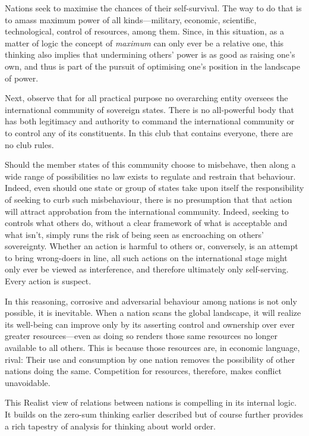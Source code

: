 Nations seek to maximise the chances of their self-survival.
The way to do that is to amass maximum power of all kinds---military,
economic, scientific, technological, control of resources, among them.
Since, in this situation, as a matter of logic
the concept of \textsl{maximum} can only ever be a relative one,
this thinking also implies that undermining others' power is as good as
raising one's own, and thus is part of the pursuit of
optimising one's position in the landscape of power.

Next, observe that for all practical purpose
no overarching entity oversees
the international community of sovereign states.
There is no all-powerful body that has both
legitimacy and authority to command
the international community or to control any of its constituents.
In this club that contains everyone, there are no club rules.

Should the member states of this community choose to misbehave,
then along a wide range of possibilities
no law exists to regulate and restrain that behaviour.
Indeed, even should one state or group of states take upon itself
the responsibility of seeking to curb such misbehaviour,
there is no presumption that that action will attract approbation
from the international community.
Indeed, seeking to controls what others do,
without a clear framework of
what is acceptable and what isn't, simply runs the risk of
being seen as
encroaching on others' sovereignty.
Whether an action is harmful to others
or, conversely, is an attempt to bring wrong-doers in line,
all such actions
on the international stage might only ever be viewed as interference,
and therefore ultimately only self-serving.
Every action is suspect.

In this reasoning, corrosive and adversarial behaviour
among nations is not only possible,
it is inevitable.
When a nation scans the global landscape, it will realize
its well-being can improve
only by its asserting control and ownership over ever
greater resources---even
as doing so renders those
same resources no longer available to all others.
This is because those resources are, in economic language, rival:
Their use and consumption by one nation removes the possibility of other
nations doing the same.
Competition for resources, therefore, makes conflict unavoidable.

This Realist view of relations between nations is compelling
in its internal logic. It builds on the zero-sum thinking
earlier described but of course further provides a rich tapestry
of analysis for thinking about world order.

